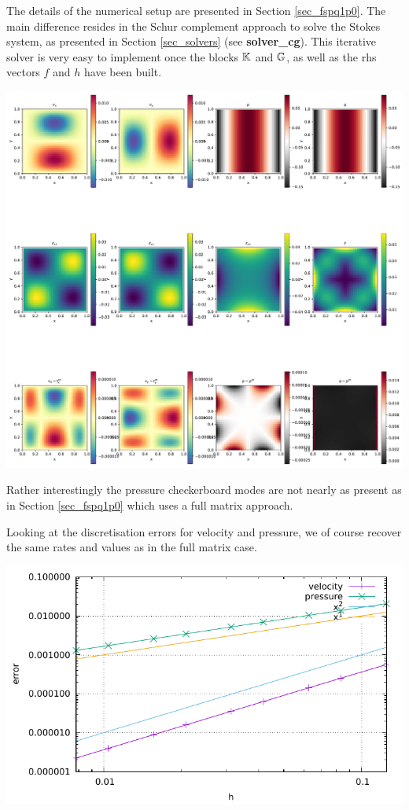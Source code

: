 The details of the numerical setup are presented in Section \ref{sec_fspq1p0}.
The main difference resides in the Schur complement approach to solve the 
Stokes system, as presented in Section \ref{sec_solvers} (see {\bf solver\_cg}).
This iterative solver is very easy to implement once the blocks ${\mathbb{K}}$ and ${\mathbb{G}}$, 
as well as the rhs vectors $f$ and $h$ have been built. 



\includegraphics[width=16cm]{python_codes/fieldstone_15/images/solution.pdf}

Rather interestingly the pressure checkerboard modes are not nearly as present as in Section \ref{sec_fspq1p0} which uses a full matrix approach. 

Looking at the discretisation errors for velocity and pressure, we of course recover the same rates and values as in the full matrix case.

\includegraphics[width=16cm]{python_codes/fieldstone_15/images/errors.pdf}

